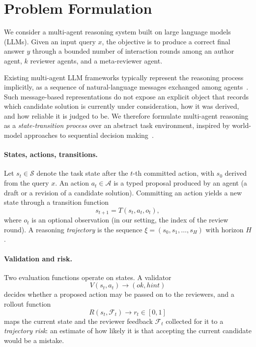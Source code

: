 \section{Problem Formulation}
\label{sec:problem_formulation}

We consider a multi-agent reasoning system built on large language models (LLMs).
Given an input query \(x\), the objective is to produce a correct final answer \(y\) through a bounded number of interaction rounds among an author agent, \(k\) reviewer agents, and a meta-reviewer agent.

Existing multi-agent LLM frameworks typically represent the reasoning process implicitly, as a sequence of natural-language messages exchanged among agents~\cite{du2024improving,qian2024chatdev,hong2024metagpt,wang2025mars}.
Such message-based representations do not expose an explicit object that records which candidate solution is currently under consideration, how it was derived, and how reliable it is judged to be.
We therefore formulate multi-agent reasoning as a \emph{state-transition process} over an abstract task environment, inspired by world-model approaches to sequential decision making~\cite{ha2018recurrent,hafner2020dream}.

\paragraph{States, actions, transitions.}
Let \(s_t \in \mathcal{S}\) denote the task state after the \(t\)-th committed action, with \(s_0\) derived from the query \(x\).
An action \(a_t \in \mathcal{A}\) is a typed proposal produced by an agent (a draft or a revision of a candidate solution).
Committing an action yields a new state through a transition function
\begin{equation}
s_{t+1} = T(s_t, a_t, o_t),
\end{equation}
where \(o_t\) is an optional observation (in our setting, the index of the review round).
A reasoning \emph{trajectory} is the sequence \(\xi = (s_0, s_1, \ldots, s_H)\) with horizon \(H\).

\paragraph{Validation and risk.}
Two evaluation functions operate on states. A validator
\begin{equation}
V(s_t, a_t) \rightarrow (\mathit{ok}, \mathit{hint})
\end{equation}
decides whether a proposed action may be passed on to the reviewers, and a rollout function
\begin{equation}
R(s_t, \mathcal{F}_t) \rightarrow r_t \in [0,1]
\end{equation}
maps the current state and the reviewer feedback \(\mathcal{F}_t\) collected for it to a \emph{trajectory risk}: an estimate of how likely it is that accepting the current candidate would be a mistake.

